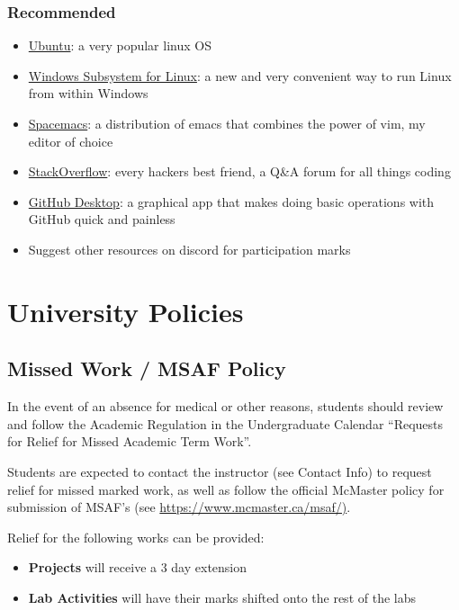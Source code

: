 \documentclass{article}
\begin{document}
\subsubsection{Recommended}
\label{sec:org1dabd0e}
\begin{itemize}
\item \href{https://www.ubuntu.com}{Ubuntu}: a very popular linux OS
\item \href{https://docs.microsoft.com/en-us/windows/wsl/install-win10}{Windows Subsystem for Linux}: a new and very convenient way to run Linux
from within Windows
\item \href{https://www.spacemacs.org/}{Spacemacs}: a distribution of emacs that combines the power of vim, my
editor of choice
\item \href{https://stackoverflow.com}{StackOverflow}: every hackers best friend, a Q\&A forum for all things coding
\item \href{https://desktop.github.com/}{GitHub Desktop}: a graphical app that makes doing basic operations with
GitHub quick and painless
\item Suggest other resources on discord for participation marks
\end{itemize}

\section{University Policies}
\label{sec:org5b971cb}
\subsection{Missed Work / MSAF Policy}
\label{sec:orge436524}
In the event of an absence for medical or other reasons, students should
review and follow the Academic Regulation in the Undergraduate Calendar
“Requests for Relief for Missed Academic Term Work”.

Students are expected to contact the instructor (see Contact Info) to request
relief for missed marked work, as well as follow the official McMaster policy
for submission of MSAF's (see \url{https://www.mcmaster.ca/msaf/)}.

Relief for the following works can be provided:
\begin{itemize}
\item \textbf{Projects} will receive a 3 day extension
\item \textbf{Lab Activities} will have their marks shifted onto the rest of the labs
\end{itemize}
\end{document}
